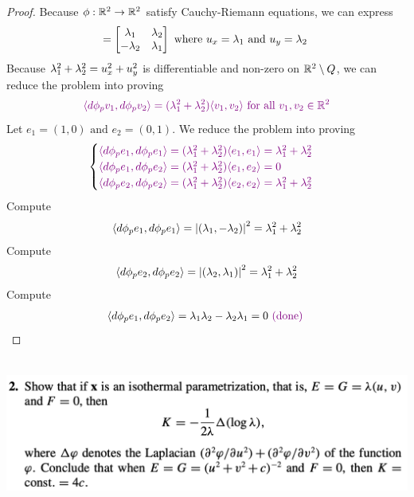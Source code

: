 \documentclass{report}
\begin{document}
\begin{proof}
Because $\phi:\mathbb{R}^2\rightarrow \mathbb{R}^2$ satisfy Cauchy-Riemann equations, we can express 
\begin{align*}
[d\phi_p]= \begin{bmatrix}
  \ld_1 & \ld_2 \\
  -\ld _2 & \ld _1
\end{bmatrix}\text{ where $u_x=\ld_1\text{ and }u_y=\ld_2$ }
\end{align*}
Because $\lambda_1^2+\lambda_2^2=u_x^2+u_y^2$ is differentiable and non-zero on $\mathbb{R}^2 \setminus Q$, we can reduce the problem into proving
\begin{align*}
  \textcolor{violet}{\langle d\phi_pv_1,d\phi_p v_2\rangle = (\lambda _1^2+\lambda _2^2)  \langle v_1,v_2\rangle \text{ for all }v_1,v_2 \in\mathbb{R}^2}
\end{align*}
Let $e_1=(1,0)\text{ and }e_2=(0,1)$. We reduce the problem into proving 
\begin{align*}
\begin{cases}
  \textcolor{violet}{\langle d\phi_p e_1,d\phi_p e_1\rangle = (\lambda_1^2 +\lambda _2^2)\langle e_1,e_1\rangle = \lambda _1^2+\lambda _2^2 }\\
  \textcolor{violet}{\langle d\phi_p e_1, d\phi_p e_2\rangle = (\lambda _1^2+ \lambda _2^2)\langle e_1,e_2\rangle =0}\\
  \textcolor{violet}{\langle d\phi_p e_2, d\phi_p e_2\rangle= (\lambda _1^2+ \lambda _2^2)\langle e_2,e_2\rangle = \lambda _1^2 +\lambda _2^2 }
\end{cases}
\end{align*}
Compute 
\begin{align*}
\langle d\phi_p e_1,d\phi_p e_1\rangle = \left|(\lambda_1, -\lambda _2)\right|^2= \lambda _1^2+\lambda _2^2
\end{align*}
Compute 
\begin{align*}
\langle d\phi_p e_2, d\phi_p e_2\rangle = \left|(\lambda _2,\lambda _1)\right|^2 = \lambda _1^2+ \lambda _2^2
\end{align*}
Compute 
\begin{align*}
\langle d\phi_p e_1,d\phi_p e_2\rangle = \lambda_1 \lambda_2 - \lambda_2 \lambda _1=0 \textcolor{violet}{\text{ (done) }}
\end{align*}
\end{proof}
\begin{question}{}{}
\includegraphics[height=5cm,width=18cm]{hw68}
\end{question}
\end{document}
